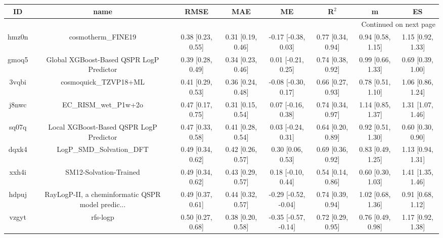 \documentclass{article}
\begin{document}
\begin{center}
\begin{longtable}{|cccccccc|}
\toprule
    ID &                                               name &               RMSE &                MAE &                    ME &              R$^2$ &                    m &                    ES \\
\midrule
\endhead
\midrule
\multicolumn{8}{r}{{Continued on next page}} \\
\midrule
\endfoot

\bottomrule
\endlastfoot
 hmz0n &                                 cosmotherm\_FINE19 &  0.38 [0.23, 0.55] &  0.31 [0.19, 0.46] &   -0.17 [-0.38, 0.03] &  0.77 [0.34, 0.94] &    0.94 [0.58, 1.15] &     1.15 [0.92, 1.33] \\
 gmoq5 &           Global XGBoost-Based QSPR LogP Predictor &  0.39 [0.28, 0.49] &  0.34 [0.23, 0.46] &    0.01 [-0.21, 0.25] &  0.74 [0.38, 0.92] &    0.99 [0.66, 1.33] &     0.69 [0.39, 1.00] \\
 3vqbi &                              cosmoquick\_TZVP18+ML &  0.41 [0.29, 0.53] &  0.36 [0.24, 0.48] &   -0.08 [-0.30, 0.17] &  0.66 [0.27, 0.93] &    0.78 [0.51, 1.10] &     1.06 [0.86, 1.24] \\
 j8nwc &                              EC\_RISM\_wet\_P1w+2o &  0.47 [0.17, 0.75] &  0.31 [0.15, 0.54] &    0.07 [-0.16, 0.38] &  0.74 [0.34, 0.97] &    1.14 [0.85, 1.37] &     1.31 [1.07, 1.46] \\
 sq07q &            Local XGBoost-Based QSPR LogP Predictor &  0.47 [0.33, 0.58] &  0.41 [0.28, 0.54] &    0.03 [-0.24, 0.31] &  0.64 [0.20, 0.89] &    0.92 [0.51, 1.30] &     0.60 [0.30, 0.90] \\
 dqxk4 &                          LogP\_SMD\_Solvation\_DFT &  0.49 [0.34, 0.62] &  0.42 [0.26, 0.57] &     0.30 [0.06, 0.53] &  0.69 [0.36, 0.92] &    0.83 [0.49, 1.25] &     1.13 [0.94, 1.31] \\
 xxh4i &                             SM12-Solvation-Trained &  0.49 [0.34, 0.62] &  0.43 [0.29, 0.57] &    0.18 [-0.10, 0.44] &  0.54 [0.14, 0.86] &    0.60 [0.30, 1.03] &     1.41 [1.35, 1.46] \\
 hdpuj &  RayLogP-II, a cheminformatic QSPR model predic... &  0.49 [0.37, 0.61] &  0.44 [0.32, 0.57] &  -0.29 [-0.52, -0.04] &  0.74 [0.39, 0.94] &    1.02 [0.68, 1.36] &     0.91 [0.68, 1.12] \\
 vzgyt &                                           rfs-logp &  0.50 [0.27, 0.68] &  0.38 [0.20, 0.58] &  -0.35 [-0.57, -0.14] &  0.72 [0.29, 0.95] &    0.76 [0.49, 0.98] &     1.17 [0.92, 1.38] \\

\end{longtable}
\end{center}
\end{document}
